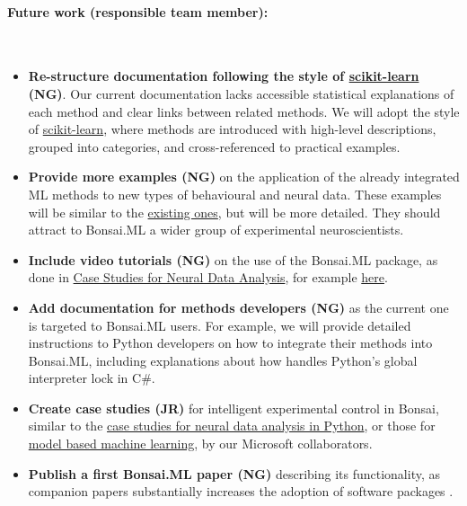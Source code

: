 \paragraph{Future work (responsible team member):}\mbox{}\\
\begin{itemize}

    \item \textbf{Re-structure documentation following the style of
        \href{https://scikit-learn.org/}{scikit-learn} (NG)}. Our current
        documentation lacks accessible statistical explanations of each method
        and clear links between related methods.  We will adopt the style of
        \href{https://scikit-learn.org/}{scikit-learn}, where methods are
        introduced with high-level descriptions, grouped into categories, and
        cross-referenced to practical examples.

    \item\textbf{Provide more examples (NG)} on the application of the already
        integrated ML methods to new types of behavioural and neural data.
        These examples will be similar to the
        \href{https://bonsai-rx.org/machinelearning/examples/README.html}{existing
        ones}, but will be more detailed.
        They should attract to Bonsai.ML a wider group of experimental
        neuroscientists.

    \item\textbf{Include video tutorials (NG)} on the use of the Bonsai.ML
        package, as done in
        \href{https://mark-kramer.github.io/Case-Studies-Python}{Case Studies
        for Neural Data Analysis}, for example
        \href{https://youtu.be/Oj9e2bB3BfI}{here}.

    \item\textbf{Add documentation for methods developers (NG)} as the current
        one is targeted to Bonsai.ML users. For example, we will provide
        detailed instructions to Python developers on how to integrate their
        methods into Bonsai.ML, including explanations about how handles
        Python's global interpreter lock in C\#.

    \item\textbf{Create case studies (JR)} for intelligent experimental control
        in Bonsai, similar to the
        \href{https://mark-kramer.github.io/Case-Studies-Python/intro.html}{case
        studies for neural data analysis in Python}, or those for
        \href{https://mbmlbook.com/index.html}{model based machine learning},
        by our Microsoft collaborators.

    \item\textbf{Publish a first Bonsai.ML paper (NG)} describing its functionality, as
        companion papers substantially increases the adoption of software
        packages \citep{lopesEtAl15,guilbeaultEtAl21}.

\end{itemize}

